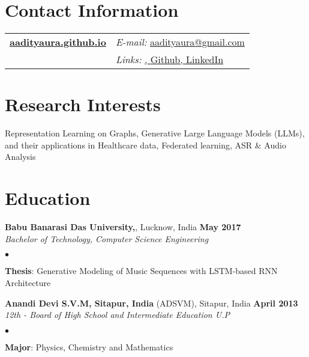 \documentclass[margin,line]{res}
\newenvironment{list2}{
  \begin{list}{$\bullet$}{%
      \setlength{\itemsep}{0in}
      \setlength{\parsep}{0in} \setlength{\parskip}{0in}
      \setlength{\topsep}{0in} \setlength{\partopsep}{0in} 
      \setlength{\leftmargin}{0.2in}}}{\end{list}}
\begin{document}

\begin{resume}
\section{\sc Contact Information}
\vspace{.05in}
\begin{tabular}{@{}p{3in}p{4in}}
\href{https://aadityaura.github.io}{\bf aadityaura.github.io} & {\it E-mail:}  \href{mailto:aadityaura@gmail.com }{aadityaura@gmail.com } \\
 & {\it Links:} \href{https://scholar.google.com/citations?user=MXqo0_UAAAAJ&hl=en}{\color{blue}{ Google Scholar}, \href{https://github.com/monk1337/} {Github}, \href{https://www.linkedin.com/in/aadityaura/}{LinkedIn}}\\
\end{tabular}


\section{\sc Research Interests}
Representation Learning on Graphs, Generative Large Language Models (LLMs), and their applications in Healthcare data, Federated learning, ASR \& Audio Analysis

\section{\sc Education}
{\bf Babu Banarasi Das University,}, Lucknow, India \hfill {\bf {May 2017}}\\
{\em Bachelor of Technology, Computer Science Engineering }
\vspace*{.3cm}
\begin{list2}
\item {\bf Thesis}: Generative Modeling of Music Sequences with LSTM-based RNN Architecture

\end{list2}
{\bf Anandi Devi S.V.M, Sitapur, India} (ADSVM), Sitapur, India \hfill {\bf {April 2013}}\\
{\em 12th - Board of High School and Intermediate Education U.P }
\vspace*{.3cm}
\begin{list2}
\item {\bf Major}: Physics, Chemistry and Mathematics
\end{list2}


\end{resume}
\end{document}
